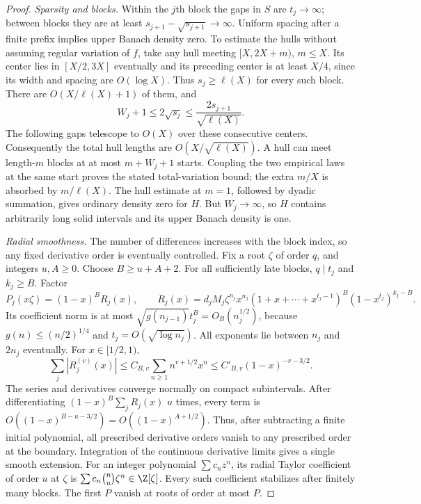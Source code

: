 \begin{proof}
\emph{Sparsity and blocks.} Within the $j$th block the gaps in $S$ are
$t_j\to\infty$; between blocks they are at least
$s_{j+1}-\sqrt{s_{j+1}}\to\infty$. Uniform spacing after a finite prefix
implies upper Banach density zero. To estimate the hulls without assuming
regular variation of $f$, take any hull meeting $[X,2X+m)$, $m\le X$.
Its center lies in $[X/2,3X]$ eventually and its preceding center is at
least $X/4$, since its width and spacing are $O(\log X)$.
Thus $s_j\ge\ell(X)$ for every such block. There are
$O(X/\ell(X)+1)$ of them, and
\[
 W_j+1\le2\sqrt{s_j}\le\frac{2s_{j+1}}{\sqrt{\ell(X)}}.
\]
The following gaps telescope to $O(X)$ over these consecutive centers.
Consequently the total hull lengths are $O(X/\sqrt{\ell(X)})$.
A hull can meet length-$m$ blocks at at most $m+W_j+1$ starts. Coupling
the two empirical laws at the same start proves the stated total-variation
bound; the extra $m/X$ is absorbed by $m/\ell(X)$.
The hull estimate at $m=1$, followed by dyadic summation, gives ordinary
density zero for $H$. But $W_j\to\infty$, so $H$ contains arbitrarily
long solid intervals and its upper Banach density is one.

\emph{Radial smoothness.} The number of differences increases with the
block index, so any fixed derivative order is eventually controlled.
Fix a root $\zeta$ of order $q$, and integers $u,A\ge0$. Choose
$B\ge u+A+2$. For all sufficiently late blocks,
$q\mid t_j$ and $k_j\ge B$. Factor
\[
 P_j(x\zeta)=(1-x)^B R_j(x),\qquad
 R_j(x)=d_jM_j\zeta^{n_j}x^{n_j}
 (1+x+\cdots+x^{t_j-1})^B(1-x^{t_j})^{k_j-B}.
\]
Its coefficient norm is at most
$\sqrt{g(n_{j-1})}t_j^B=O_B(n_j^{1/2})$, because
$g(n)\le(n/2)^{1/4}$ and $t_j=O(\sqrt{\log n_j})$.
All exponents lie between $n_j$ and $2n_j$ eventually. For $x\in[1/2,1)$,
\[
 \sum_j|R_j^{(v)}(x)|
 \le C_{B,v}\sum_{n\ge1}n^{v+1/2}x^n
 \le C'_{B,v}(1-x)^{-v-3/2}.
\]
The series and derivatives converge normally on compact subintervals.
After differentiating $(1-x)^B\sum_jR_j(x)$ $u$ times, every term is
$O((1-x)^{B-u-3/2})=O((1-x)^{A+1/2})$. Thus, after subtracting a
finite initial polynomial, all prescribed derivative orders vanish to
any prescribed order at the boundary. Integration of the continuous
derivative limits gives a single smooth extension. For an integer
polynomial $\sum c_nz^n$, its radial Taylor coefficient of order $u$
at $\zeta$ is $\sum c_n\binom nu\zeta^n\in\Z[\zeta]$.
Every such coefficient stabilizes after finitely many blocks. The
first $P$ vanish at roots of order at most $P$.


\end{proof}
